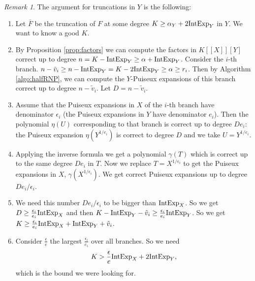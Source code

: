\documentclass[a4paper,11pt,reqno]{amsart}%
\theoremstyle{definition}
\theoremstyle{plain}
\theoremstyle{remark}
\newtheorem{remark}[defn]{Remark}
\newcommand\ct[1]{\text{\rmfamily\upshape #1}}
\newcommand{\IntExpX}{\ct{IntExp}_X}
\newcommand{\IntExpY}{\ct{IntExp}_Y}
\begin{document}
\begin{remark}
The argument for truncations in $Y$ is the following:
\begin{enumerate}
\item Let $\bar F$ be the truncation of $F$ at some degree $K \ge \alpha_Y + 2 \IntExpY$ in $Y$. We want to know a good $K$.
\item By Proposition \ref{prop:factors} we can compute the factors in $K[[X]][Y]$ correct up to degree $n = K - \IntExpY \ge \alpha + \IntExpY$. Consider the $i$-th branch. $n - \tilde v_i \ge n - \IntExpY = K - 2 \IntExpY \ge \alpha \ge r_i$. Then by Algorithm \ref{algo:halfRNP}, we can compute the $Y$-Puiseux expansions of this branch correct up to degree $n - \tilde v_i$. Let $D = n - \tilde v_i$.
\item Assume that the Puiseux expansions in $X$ of the $i$-th branch have denominator $\epsilon_i$ (the Puiseux expansions in $Y$ have denominator $e_i$). Then the polynomial $\eta(U)$ corresponding to that branch is correct up to degree $De_i$: the Puiseux expansion $\eta(Y^{1/{e_i}})$ is correct to degree $D$ and we take $U = Y^{1/{e_i}}$.
\item Applying the inverse formula we get a polynomial $\gamma(T)$ which is correct up to the same degree $De_i$ in $T$. Now we replace $T = X^{1/\epsilon_i}$ to get the Puiseux expansions in $X$, $\gamma(X^{1/\epsilon_i})$. We get correct Puiseux expansions up to degree $De_i/\epsilon_i$.
\item We need this number $De_i/\epsilon_i$ to be bigger than $\IntExpX$. So we get $D \ge \frac{\epsilon_i}{e_i}\IntExpX$ and then $K - \IntExpY - \tilde v_i \ge \frac{\epsilon_i}{e_i} \IntExpY$. So we get $K \ge \frac{\epsilon_i}{e_i}\IntExpX + \IntExpY + \tilde v_i$.

\item Consider $\frac{\epsilon}{e}$ the largest $\frac{\epsilon_i}{e_i}$ over all branches. So we need
$$K > \frac{\epsilon}{e} \IntExpX + 2 \IntExpY,$$
which is the bound we were looking for.

\end{enumerate}

%


\end{remark}
\end{document}
